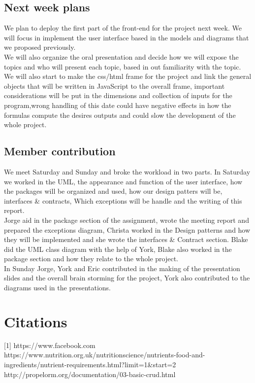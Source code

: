 \documentclass[a4paper]{article}
\begin{document}
\subsection{Next week plans}
We plan to deploy the first part of the front-end for the project next week. We will focus in implement the user interface based in the models and diagrams that we proposed previously.\\

\noindent We will also organize the oral presentation and decide how we will expose the topics and who will present each topic, based in out familiarity with the topic.\\

\noindent We will also start to make the css/html frame for the project and link the general objects that will be written in JavaScript to the overall frame, important considerations will be put in the dimensions and collection of inputs for the program,wrong handling of this date could have negative effects in how the formulas compute the desires outputs and could slow the development of the whole project. 

\subsection{Member contribution}
We meet Saturday and Sunday and broke the workload in two parts. In Saturday we worked in the UML, the appearance and function of the user interface, how the packages will be organized and used, how our design patters will be, interfaces \& contracts, Which exceptions will be handle and the writing of this report.\\

\noindent Jorge aid in the package section of the assignment, wrote the meeting report and prepared the exceptions diagram, Christa worked in the Design patterns and how they will be implemented and she wrote the interfaces \& Contract section. Blake did the UML class diagram with the help of York, Blake also worked in the package section  and how they relate to the whole project.\\

In Sunday Jorge, York and Eric contributed  in the making of the presentation slides and the overall  brain storming for the project, York also contributed to the diagrams used in the presentations.


\pagebreak
\section{Citations}
[1] https://www.facebook.com
\newline
\newline
[2] https://www.nutrition.org.uk/nutritionscience/nutrients-food-and-ingredients/nutrient-requirements.html?limit=1\&start=2
\newline
\newline
[3]http://propelorm.org/documentation/03-basic-crud.html
\end{document}
